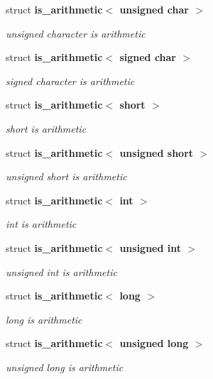 \begin{CompactItemize}
struct {\bf is\_\-arithmetic$<$ unsigned char $>$}
\begin{CompactList}\small\item\em unsigned character is arithmetic \item\end{CompactList}\item 
struct {\bf is\_\-arithmetic$<$ signed char $>$}
\begin{CompactList}\small\item\em signed character is arithmetic \item\end{CompactList}\item 
struct {\bf is\_\-arithmetic$<$ short $>$}
\begin{CompactList}\small\item\em short is arithmetic \item\end{CompactList}\item 
struct {\bf is\_\-arithmetic$<$ unsigned short $>$}
\begin{CompactList}\small\item\em unsigned short is arithmetic \item\end{CompactList}\item 
struct {\bf is\_\-arithmetic$<$ int $>$}
\begin{CompactList}\small\item\em int is arithmetic \item\end{CompactList}\item 
struct {\bf is\_\-arithmetic$<$ unsigned int $>$}
\begin{CompactList}\small\item\em unsigned int is arithmetic \item\end{CompactList}\item 
struct {\bf is\_\-arithmetic$<$ long $>$}
\begin{CompactList}\small\item\em long is arithmetic \item\end{CompactList}\item 
struct {\bf is\_\-arithmetic$<$ unsigned long $>$}
\begin{CompactList}\small\item\em unsigned long is arithmetic \item\end{CompactList}\item 

\end{CompactItemize}
